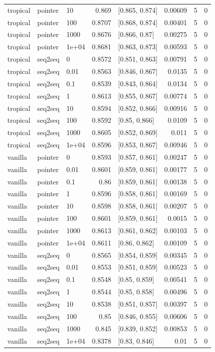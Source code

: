 \documentclass[10pt]{article}
\begin{document}
{\begin{longtable}{lllrlrrr}
tropical & pointer & 10 & 0.869 & [0.865, 0.874] & 0.00609 & 5 & 0\\
tropical & pointer & 100 & 0.8707 & [0.868, 0.874] & 0.00401 & 5 & 0\\
tropical & pointer & 1000 & 0.8676 & [0.866, 0.87] & 0.00275 & 5 & 0\\
tropical & pointer & 1e+04 & 0.8681 & [0.863, 0.873] & 0.00593 & 5 & 0\\
tropical & seq2seq & 0 & 0.8572 & [0.851, 0.863] & 0.00791 & 5 & 0\\
tropical & seq2seq & 0.01 & 0.8563 & [0.846, 0.867] & 0.0135 & 5 & 0\\
tropical & seq2seq & 0.1 & 0.8539 & [0.843, 0.864] & 0.0134 & 5 & 0\\
tropical & seq2seq & 1 & 0.8613 & [0.855, 0.867] & 0.00774 & 5 & 0\\
tropical & seq2seq & 10 & 0.8594 & [0.852, 0.866] & 0.00916 & 5 & 0\\
tropical & seq2seq & 100 & 0.8592 & [0.85, 0.866] & 0.0109 & 5 & 0\\
tropical & seq2seq & 1000 & 0.8605 & [0.852, 0.869] & 0.011 & 5 & 0\\
tropical & seq2seq & 1e+04 & 0.8596 & [0.853, 0.867] & 0.00946 & 5 & 0\\
vanilla & pointer & 0 & 0.8593 & [0.857, 0.861] & 0.00247 & 5 & 0\\
vanilla & pointer & 0.01 & 0.8601 & [0.859, 0.861] & 0.00177 & 5 & 0\\
vanilla & pointer & 0.1 & 0.86 & [0.859, 0.861] & 0.00138 & 5 & 0\\
vanilla & pointer & 1 & 0.8596 & [0.858, 0.861] & 0.00169 & 5 & 0\\
vanilla & pointer & 10 & 0.8598 & [0.858, 0.861] & 0.00207 & 5 & 0\\
vanilla & pointer & 100 & 0.8601 & [0.859, 0.861] & 0.0015 & 5 & 0\\
vanilla & pointer & 1000 & 0.8613 & [0.861, 0.862] & 0.00103 & 5 & 0\\
vanilla & pointer & 1e+04 & 0.8611 & [0.86, 0.862] & 0.00109 & 5 & 0\\
vanilla & seq2seq & 0 & 0.8565 & [0.854, 0.859] & 0.00345 & 5 & 0\\
vanilla & seq2seq & 0.01 & 0.8553 & [0.851, 0.859] & 0.00523 & 5 & 0\\
vanilla & seq2seq & 0.1 & 0.8548 & [0.85, 0.859] & 0.00541 & 5 & 0\\
vanilla & seq2seq & 1 & 0.8544 & [0.85, 0.858] & 0.00496 & 5 & 0\\
vanilla & seq2seq & 10 & 0.8538 & [0.851, 0.857] & 0.00397 & 5 & 0\\
vanilla & seq2seq & 100 & 0.85 & [0.846, 0.855] & 0.00606 & 5 & 0\\
vanilla & seq2seq & 1000 & 0.845 & [0.839, 0.852] & 0.00853 & 5 & 0\\
vanilla & seq2seq & 1e+04 & 0.8378 & [0.83, 0.846] & 0.01 & 5 & 0\\
\bottomrule
\end{longtable}
}
\end{document}
